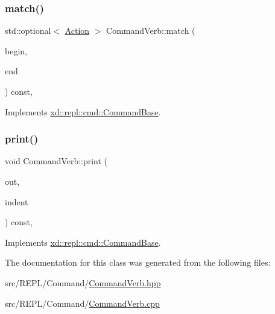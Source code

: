 \subsubsection{\texorpdfstring{match()}{match()}}
{\footnotesize\ttfamily std\+::optional$<$ \mbox{\hyperlink{namespacexd_1_1repl_1_1cmd_a7274841bd02a9c5da0ba48ae204ab3d5}{Action}} $>$ Command\+Verb\+::match (\begin{DoxyParamCaption}\item[{std\+::string\+::const\+\_\+iterator}]{begin,  }\item[{std\+::string\+::const\+\_\+iterator}]{end }\end{DoxyParamCaption}) const\hspace{0.3cm}{\ttfamily [override]}, {\ttfamily [virtual]}}



Implements \mbox{\hyperlink{classxd_1_1repl_1_1cmd_1_1_command_base_adc60ebee9e6b13fd4e9305bd436555ee}{xd\+::repl\+::cmd\+::\+Command\+Base}}.

\mbox{\label{classxd_1_1repl_1_1cmd_1_1_command_verb_a63744f7758a04b9752e70d6b7e2697a8}} 
\subsubsection{\texorpdfstring{print()}{print()}}
{\footnotesize\ttfamily void Command\+Verb\+::print (\begin{DoxyParamCaption}\item[{std\+::ostream \&}]{out,  }\item[{\mbox{\hyperlink{classxd_1_1util_1_1_indent_helper}{xd\+::util\+::\+Indent\+Helper}} \&}]{indent }\end{DoxyParamCaption}) const\hspace{0.3cm}{\ttfamily [override]}, {\ttfamily [virtual]}}



Implements \mbox{\hyperlink{classxd_1_1repl_1_1cmd_1_1_command_base_acb731ef346c5c1eccce3c88749fed8e8}{xd\+::repl\+::cmd\+::\+Command\+Base}}.



The documentation for this class was generated from the following files\+:\begin{DoxyCompactItemize}
\item 
src/\+R\+E\+P\+L/\+Command/\mbox{\hyperlink{_command_verb_8hpp}{Command\+Verb.\+hpp}}\item 
src/\+R\+E\+P\+L/\+Command/\mbox{\hyperlink{_command_verb_8cpp}{Command\+Verb.\+cpp}}\end{DoxyCompactItemize}
